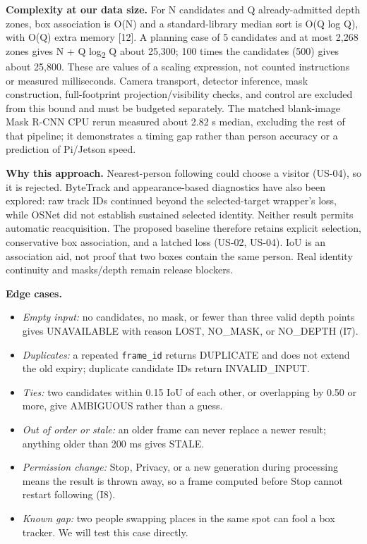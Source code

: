 \documentclass[12pt,letterpaper]{article}
\newcommand{\field}[1]{\texttt{#1}}
\begin{document}
\textbf{Complexity at our data size.} For N candidates and Q already-admitted depth zones, box association is O(N) and a standard-library median sort is O(Q log Q), with O(Q) extra memory [12]. A planning case of 5 candidates and at most 2,268 zones gives N + Q log\textsubscript{2} Q about 25,300; 100 times the candidates (500) gives about 25,800. These are values of a scaling expression, not counted instructions or measured milliseconds. Camera transport, detector inference, mask construction, full-footprint projection/visibility checks, and control are excluded from this bound and must be budgeted separately. The matched blank-image Mask R-CNN CPU rerun measured about 2.82 s median, excluding the rest of that pipeline; it demonstrates a timing gap rather than person accuracy or a prediction of Pi/Jetson speed.

\textbf{Why this approach.} Nearest-person following could choose a visitor (US-04), so it is rejected. ByteTrack and appearance-based diagnostics have also been explored: raw track IDs continued beyond the selected-target wrapper's loss, while OSNet did not establish sustained selected identity. Neither result permits automatic reacquisition. The proposed baseline therefore retains explicit selection, conservative box association, and a latched loss (US-02, US-04). IoU is an association aid, not proof that two boxes contain the same person. Real identity continuity and masks/depth remain release blockers.

\textbf{Edge cases.}
\begin{itemize}\setlength{\itemsep}{2pt}
\item \emph{Empty input:} no candidates, no mask, or fewer than three valid depth points gives UNAVAILABLE with reason LOST, NO\_MASK, or NO\_DEPTH (I7).
\item \emph{Duplicates:} a repeated \field{frame\_id} returns DUPLICATE and does not extend the old expiry; duplicate candidate IDs return INVALID\_INPUT.
\item \emph{Ties:} two candidates within 0.15 IoU of each other, or overlapping by 0.50 or more, give AMBIGUOUS rather than a guess.
\item \emph{Out of order or stale:} an older frame can never replace a newer result; anything older than 200 ms gives STALE.
\item \emph{Permission change:} Stop, Privacy, or a new generation during processing means the result is thrown away, so a frame computed before Stop cannot restart following (I8).
\item \emph{Known gap:} two people swapping places in the same spot can fool a box tracker. We will test this case directly.
\end{itemize}
\end{document}
